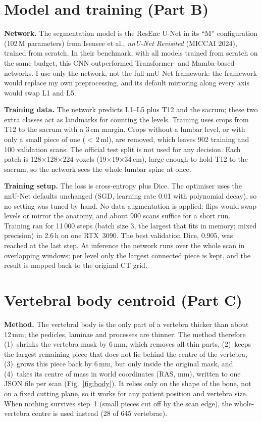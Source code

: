 \documentclass[10pt,a4paper]{article}
\begin{document}
\section{Model and training (Part B)}
\textbf{Network.} The segmentation model is the ResEnc U-Net in its ``M'' configuration (102\,M parameters) from Isensee et al., \emph{nnU-Net Revisited} (MICCAI 2024), trained from scratch. In their benchmark, with all models trained from scratch on the same budget, this CNN outperformed Transformer- and Mamba-based networks. I use only the network, not the full nnU-Net framework: the framework would replace my own preprocessing, and its default mirroring along every axis would swap L1 and L5.

\textbf{Training data.} The network predicts L1--L5 plus T12 and the sacrum; these two extra classes act as landmarks for counting the levels. Training uses crops from T12 to the sacrum with a 3\,cm margin. Crops without a lumbar level, or with only a small piece of one ($<$\,2\,ml), are removed, which leaves 902 training and 100 validation scans. The official test split is not used for any decision. Each patch is 128$\times$128$\times$224 voxels (19$\times$19$\times$34\,cm), large enough to hold T12 to the sacrum, so the network sees the whole lumbar spine at once.

\textbf{Training setup.} The loss is cross-entropy plus Dice. The optimiser uses the nnU-Net defaults unchanged (SGD, learning rate 0.01 with polynomial decay), so no setting was tuned by hand. No data augmentation is applied: flips would swap levels or mirror the anatomy, and about 900 scans suffice for a short run. Training ran for 11\,000 steps (batch size 3, the largest that fits in memory; mixed precision) in 2.6\,h on one RTX~3090. The best validation Dice, 0.905, was reached at the last step. At inference the network runs over the whole scan in overlapping windows; per level only the largest connected piece is kept, and the result is mapped back to the original CT grid.

\section{Vertebral body centroid (Part C)}
\textbf{Method.} The vertebral body is the only part of a vertebra thicker than about 12\,mm; the pedicles, laminae and processes are thinner. The method therefore
(1)~shrinks the vertebra mask by 6\,mm, which removes all thin parts,
(2)~keeps the largest remaining piece that does not lie behind the centre of the vertebra,
(3)~grows this piece back by 6\,mm, but only inside the original mask, and
(4)~takes its centre of mass in world coordinates (RAS, mm), written to one JSON file per scan (Fig.~\ref{fig:body}).
It relies only on the shape of the bone, not on a fixed cutting plane, so it works for any patient position and vertebra size. When nothing survives step~1 (small pieces cut off by the scan edge), the whole-vertebra centre is used instead (28 of 645 vertebrae).
\end{document}
